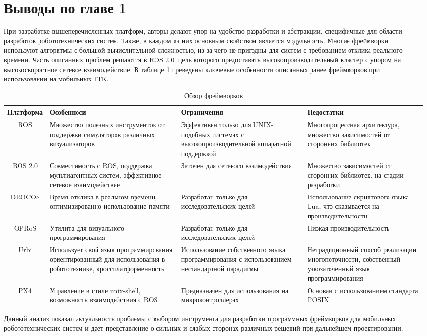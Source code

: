 \section*{Выводы по главе 1}

При разработке вышеперечисленных платформ, авторы делают упор на удобство разработки и абстракции, специфичные для области разработок робототехнических систем. Также, в каждом из них основным свойством является модульность. Многие фреймворки используют алгоритмы с большой вычислительной сложностью, из-за чего не пригодны для систем с требованием отклика реального времени. Часть описанных проблем решаются в ROS 2.0, цель которого предоставить высокопроизводительный кластер с упором на высокоскоростное сетевое взаимодействие. В таблице \ref{tab:frameworks} преведены ключевые особенности описанных ранее фреймворков при использовании на мобильных РТК.

\begin{table}
    \caption{\label{tab:frameworks}Обзор фреймворков}
    \begin{center}
        \begin{tabularx}{\textwidth}{|c|X|X|X|}
            \hline
            Платформа & Особенноси & Ограничения & Недостатки \\
            \hline
            ROS & Множество полезных инструментов от поддержки симуляторов различных визуализаторов & Эффективен только для UNIX-подобных системах с высокопроизводительной аппаратной поддержкой & Многопроцессная архитектура, множество зависимостей от сторонних библиотек \\
            \hline
            ROS 2.0 & Совместимость с ROS, поддержка мультиагентных систем, эффективное сетевое взаимодействие & Заточен для сетевого взаимодействия & Множество зависимостей от сторонних библиотек, на стадии разработки \\
            \hline
            OROCOS & Время отклика в реальном времени, оптимизированно использование памяти & Разработан только для исследовательских целей & Использование скриптового языка Lua, что сказывается на производительности \\
            \hline
            OPRoS & Утилита для визуального программирования & Разработан только для исследовательских целей & Низкая производительность \\
            \hline
            Urbi & Использует свой язык программирования ориентированный для использования в робототехнике, кроссплатформенность & Использование собственного языка программирования с использованием нестандартной парадигмы & Нетрадиционный способ реализации многопоточности, собственный узкозаточенный язык программирования \\
            \hline
            PX4 & Управление в стиле unix-shell, возможность взаимодействия с ROS & Предназначен для использования на микроконтроллерах & Основан с использованием стандарта POSIX \\
            \hline
        \end{tabularx}
    \end{center}
\end{table}

Данный анализ показал актуальность проблемы с выбором инструмента для разработки программных фреймворков для мобильных робототехнических систем и дает представление о сильных и слабых сторонах различных решений при дальнейшем проектировании. 